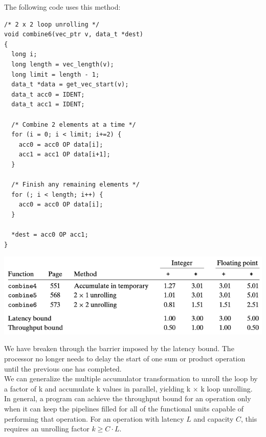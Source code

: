 \documentclass[11pt]{article}
\begin{document}
The following code uses this method:\\
\begin{verbatim}
/* 2 x 2 loop unrolling */
void combine6(vec_ptr v, data_t *dest)
{
  long i;
  long length = vec_length(v);
  long limit = length - 1;
  data_t *data = get_vec_start(v);
  data_t acc0 = IDENT;
  data_t acc1 = IDENT;

  /* Combine 2 elements at a time */
  for (i = 0; i < limit; i+=2) {
    acc0 = acc0 OP data[i];
    acc1 = acc1 OP data[i+1];
  }

  /* Finish any remaining elements */
  for (; i < length; i++) {
    acc0 = acc0 OP data[i];
  }

  *dest = acc0 OP acc1;
}

\end{verbatim}

\begin{center}
\includegraphics[width=.9\linewidth]{pics/combine6-performance.png}
\end{center}

We have breaken through the barrier imposed by the latency bound. The processor no longer needs to delay the start of one sum or product operation until the previous one has completed.\\

We can generalize the multiple accumulator transformation to unroll the loop by a factor of k and accumulate k values in parallel, yielding k × k loop unrolling.\\

In general, a program can achieve the throughput bound for an operation only when it can keep the pipelines filled for all of the functional units capable of performing that operation. For an operation with latency \(L\) and capacity \(C\), this requires an unrolling factor \(k \ge C \cdot L\).\\
\end{document}
